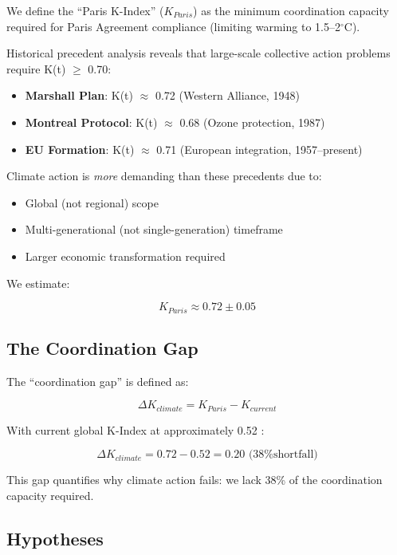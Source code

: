 \documentclass[12pt,a4paper]{article}
\begin{document}
We define the ``Paris K-Index'' ($K_{Paris}$) as the minimum coordination capacity required for Paris Agreement compliance (limiting warming to 1.5--2$^\circ$C).

Historical precedent analysis reveals that large-scale collective action problems require K(t) $\geq$ 0.70:

\begin{itemize}
    \item \textbf{Marshall Plan}: K(t) $\approx$ 0.72 (Western Alliance, 1948)
    \item \textbf{Montreal Protocol}: K(t) $\approx$ 0.68 (Ozone protection, 1987)
    \item \textbf{EU Formation}: K(t) $\approx$ 0.71 (European integration, 1957--present)
\end{itemize}

Climate action is \textit{more} demanding than these precedents due to:
\begin{itemize}
    \item Global (not regional) scope
    \item Multi-generational (not single-generation) timeframe
    \item Larger economic transformation required
\end{itemize}

We estimate:

\begin{equation}
K_{Paris} \approx 0.72 \pm 0.05
\end{equation}

\subsection{The Coordination Gap}

The ``coordination gap'' is defined as:

\begin{equation}
\Delta K_{climate} = K_{Paris} - K_{current}
\end{equation}

With current global K-Index at approximately 0.52 \citep{Paper3}:

\begin{equation}
\Delta K_{climate} = 0.72 - 0.52 = 0.20 \text{ (38\% shortfall)}
\end{equation}

This gap quantifies why climate action fails: we lack 38\% of the coordination capacity required.

\subsection{Hypotheses}
\end{document}
